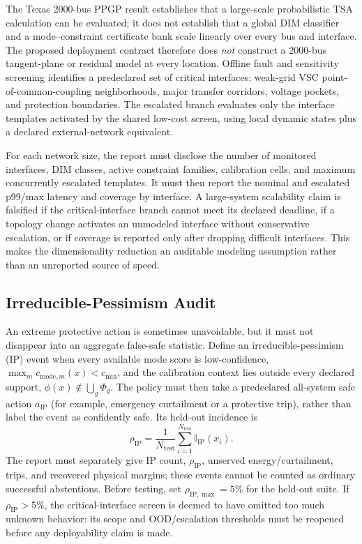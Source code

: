 \documentclass[conference]{IEEEtran}
\begin{document}
The Texas 2000-bus PPGP result \cite{ye2024ppgp} establishes that a large-scale probabilistic TSA calculation can be evaluated; it does not establish that a global DIM classifier and a mode--constraint certificate bank scale linearly over every bus and interface. The proposed deployment contract therefore does \emph{not} construct a 2000-bus tangent-plane or residual model at every location. Offline fault and sensitivity screening identifies a predeclared set of critical interfaces: weak-grid VSC point-of-common-coupling neighborhoods, major transfer corridors, voltage pockets, and protection boundaries. The escalated branch evaluates only the interface templates activated by the shared low-cost screen, using local dynamic states plus a declared external-network equivalent.

For each network size, the report must disclose the number of monitored interfaces, DIM classes, active constraint families, calibration cells, and maximum concurrently escalated templates. It must then report the nominal and escalated p99/max latency and coverage by interface. A large-system scalability claim is falsified if the critical-interface branch cannot meet its declared deadline, if a topology change activates an unmodeled interface without conservative escalation, or if coverage is reported only after dropping difficult interfaces. This makes the dimensionality reduction an auditable modeling assumption rather than an unreported source of speed.

\subsection{Irreducible-Pessimism Audit}

An extreme protective action is sometimes unavoidable, but it must not disappear into an aggregate false-safe statistic. Define an irreducible-pessimism (IP) event when every available mode score is low-confidence, $\max_m c_{\mathrm{mode},m}(x)<c_{\min}$, and the calibration context lies outside every declared support, $\phi(x)\notin\bigcup_g\Phi_g$. The policy must then take a predeclared all-system safe action $a_{\mathrm{IP}}$ (for example, emergency curtailment or a protective trip), rather than label the event as confidently safe. Its held-out incidence is
\begin{equation}
\rho_{\mathrm{IP}}=\frac{1}{N_{\mathrm{test}}}
\sum_{i=1}^{N_{\mathrm{test}}}\mathbb{I}_{\mathrm{IP}}(x_i).
\label{eq:irreduciblepessimism}
\end{equation}
The report must separately give IP count, $\rho_{\mathrm{IP}}$, unserved energy/curtailment, trips, and recovered physical margins; these events cannot be counted as ordinary successful abstentions. Before testing, set $\rho_{\mathrm{IP},\max}=5\%$ for the held-out suite. If $\rho_{\mathrm{IP}}>5\%$, the critical-interface screen is deemed to have omitted too much unknown behavior: its scope and OOD/escalation thresholds must be reopened before any deployability claim is made.
\end{document}
